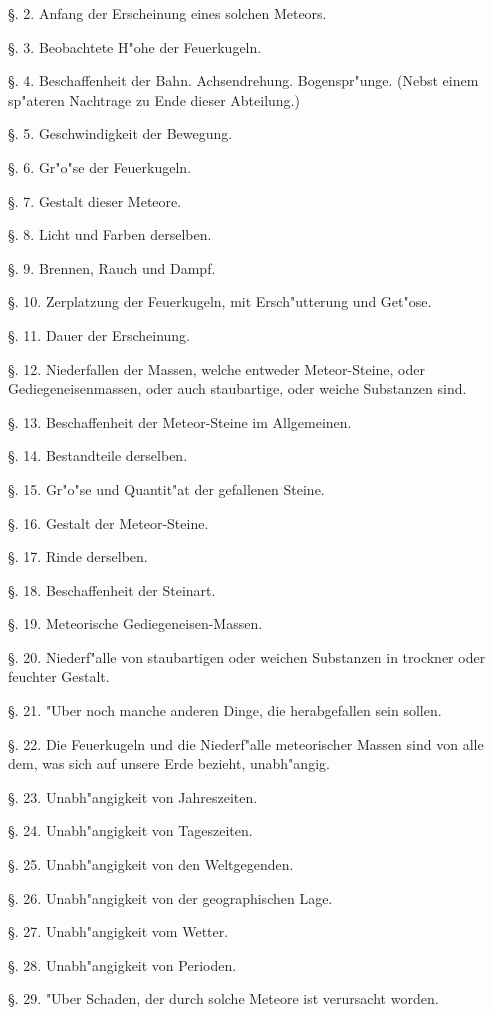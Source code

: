 \documentclass[a4paper, 11pt, oneside, polutonikogreek, german]{article}
\begin{document}
§. 2. Anfang der Erscheinung eines solchen Meteors.

§. 3. Beobachtete H"ohe der Feuerkugeln.

§. 4. Beschaffenheit der Bahn. Achsendrehung. Bogenspr"unge. (Nebst einem sp"ateren Nachtrage zu Ende dieser Abteilung.)

§. 5. Geschwindigkeit der Bewegung.

§. 6. Gr"o"se der Feuerkugeln.

§. 7. Gestalt dieser Meteore.

§. 8. Licht und Farben derselben.

§. 9. Brennen, Rauch und Dampf.

§. 10. Zerplatzung der Feuerkugeln, mit Ersch"utterung und Get"ose.

§. 11. Dauer der Erscheinung.

§. 12. Niederfallen der Massen, welche entweder Meteor-Steine, oder Gediegeneisenmassen, oder auch staubartige, oder weiche Substanzen sind.

§. 13. Beschaffenheit der Meteor-Steine im Allgemeinen.

§. 14. Bestandteile derselben.

§. 15. Gr"o"se und Quantit"at der gefallenen Steine.

§. 16. Gestalt der Meteor-Steine.

§. 17. Rinde derselben.

§. 18. Beschaffenheit der Steinart.

§. 19. Meteorische Gediegeneisen-Massen.

§. 20. Niederf"alle von staubartigen oder weichen Substanzen in trockner oder feuchter Gestalt.

§. 21. "Uber noch manche anderen Dinge, die herabgefallen sein sollen.

§. 22. Die Feuerkugeln und die Niederf"alle meteorischer Massen sind von alle dem, was sich auf unsere Erde bezieht, unabh"angig.

§. 23. Unabh"angigkeit von Jahreszeiten.

§. 24. Unabh"angigkeit von Tageszeiten.

§. 25. Unabh"angigkeit von den Weltgegenden.

§. 26. Unabh"angigkeit von der geographischen Lage.

§. 27. Unabh"angigkeit vom Wetter.

§. 28. Unabh"angigkeit von Perioden.

§. 29. "Uber Schaden, der durch solche Meteore ist verursacht worden.
\end{document}
